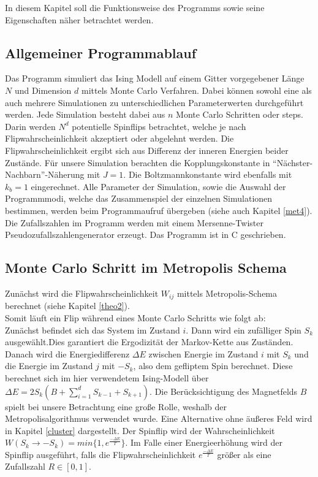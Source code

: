 
In diesem Kapitel soll die Funktionsweise des Programms sowie seine Eigenschaften näher betrachtet werden.


\subsection{Allgemeiner Programmablauf}

Das Programm simuliert das Ising Modell auf einem Gitter vorgegebener Länge $N$ und Dimension $d$ mittels Monte Carlo Verfahren. Dabei können sowohl eine als auch mehrere Simulationen zu unterschiedlichen Parameterwerten durchgeführt werden. Jede Simulation besteht dabei aus $n$ Monte Carlo Schritten oder steps. Darin werden $N^{d}$ potentielle Spinflips betrachtet, welche je nach Flipwahrscheinlichkeit akzeptiert oder abgelehnt werden. Die Flipwahrscheinlichkeit ergibt sich aus Differenz der inneren Energien beider Zustände. Für unsere Simulation berachten die Kopplungskonstante in “Nächster-Nachbarn”-Näherung mit $J=1$. Die Boltzmannkonstante wird ebenfalls mit $k_{b}=1$ eingerechnet. 
Alle Parameter der Simulation, sowie die Auswahl der Programmmodi, welche das Zusammenspiel der einzelnen Simulationen bestimmen, werden beim Programmaufruf übergeben (siehe auch Kapitel \ref{met4}). Die Zufallszahlen im Programm werden mit einem Mersenne-Twister Pseudozufallszahlengenerator erzeugt. Das Programm ist in C geschrieben.


\subsection{Monte Carlo Schritt im Metropolis Schema}

Zunächst wird die Flipwahrscheinlichkeit $W_{ij}$ mittels Metropolis-Schema berechnet (siehe Kapitel \ref{theo2}).\\
Somit läuft ein Flip während eines Monte Carlo Schritts wie folgt ab:\\
Zunächst befindet sich das System im Zustand $i$. Dann wird ein zufälliger Spin $S_{k}$ ausgewählt.Dies garantiert die Ergodizität der Markov-Kette aus Zuständen. Danach wird die Energiedifferenz $\Delta E$ zwischen Energie im Zustand $i$ mit $S_{k}$ und die Energie im Zustand $j$ mit $-S_{k}$, also dem gefliptem Spin berechnet. Diese berechnet sich im hier verwendetem Ising-Modell über $\Delta E=2S_{k}(B+\sum_{i=1}^{d}S_{k-1}+S_{k+1})$. Die Berücksichtigung des Magnetfelds $B$ spielt bei unsere Betrachtung eine große Rolle, weshalb der Metropolisalgorithmus verwendet wurde. Eine Alternative ohne äußeres Feld wird in Kapitel \ref{cluster} dargestellt. Der Spinflip wird der Wahrscheinlichkeit $W(S_k \rightarrow -S_k)=min\{ 1, e^{\frac{-\Delta E}{T}} \}$. Im Falle einer Energieerhöhung wird der Spinflip ausgeführt, falls die Flipwahrscheinlichkeit $e^{\frac{-\Delta E}{T}}$ größer als eine Zufallszahl $R\in[0,1]$.


